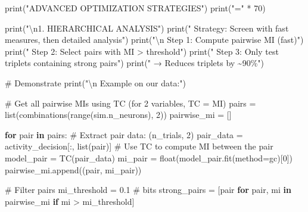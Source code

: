 \documentclass[
  11pt,
  letterpaper,
  oneside,
  openany]{book}
\newenvironment{Shaded}{\begin{snugshade}}{\end{snugshade}}
\newcommand{\BuiltInTok}[1]{\textcolor[rgb]{0.00,0.23,0.31}{#1}}
\newcommand{\CharTok}[1]{\textcolor[rgb]{0.13,0.47,0.30}{#1}}
\newcommand{\CommentTok}[1]{\textcolor[rgb]{0.37,0.37,0.37}{#1}}
\newcommand{\ControlFlowTok}[1]{\textcolor[rgb]{0.00,0.23,0.31}{\textbf{#1}}}
\newcommand{\DecValTok}[1]{\textcolor[rgb]{0.68,0.00,0.00}{#1}}
\newcommand{\FloatTok}[1]{\textcolor[rgb]{0.68,0.00,0.00}{#1}}
\newcommand{\KeywordTok}[1]{\textcolor[rgb]{0.00,0.23,0.31}{\textbf{#1}}}
\newcommand{\NormalTok}[1]{\textcolor[rgb]{0.00,0.23,0.31}{#1}}
\newcommand{\OperatorTok}[1]{\textcolor[rgb]{0.37,0.37,0.37}{#1}}
\newcommand{\StringTok}[1]{\textcolor[rgb]{0.13,0.47,0.30}{#1}}
\begin{document}
\begin{Shaded}
\begin{Highlighting}[]
\BuiltInTok{print}\NormalTok{(}\StringTok{"ADVANCED OPTIMIZATION STRATEGIES"}\NormalTok{)}
\BuiltInTok{print}\NormalTok{(}\StringTok{"="} \OperatorTok{*} \DecValTok{70}\NormalTok{)}

\BuiltInTok{print}\NormalTok{(}\StringTok{"}\CharTok{\textbackslash{}n}\StringTok{1. HIERARCHICAL ANALYSIS"}\NormalTok{)}
\BuiltInTok{print}\NormalTok{(}\StringTok{"   Strategy: Screen with fast measures, then detailed analysis"}\NormalTok{)}
\BuiltInTok{print}\NormalTok{(}\StringTok{"}\CharTok{\textbackslash{}n}\StringTok{   Step 1: Compute pairwise MI (fast)"}\NormalTok{)}
\BuiltInTok{print}\NormalTok{(}\StringTok{"   Step 2: Select pairs with MI \textgreater{} threshold"}\NormalTok{)}
\BuiltInTok{print}\NormalTok{(}\StringTok{"   Step 3: Only test triplets containing strong pairs"}\NormalTok{)}
\BuiltInTok{print}\NormalTok{(}\StringTok{"   → Reduces triplets by \textasciitilde{}90\%"}\NormalTok{)}

\CommentTok{\# Demonstrate}
\BuiltInTok{print}\NormalTok{(}\StringTok{"}\CharTok{\textbackslash{}n}\StringTok{   Example on our data:"}\NormalTok{)}

\CommentTok{\# Get all pairwise MIs using TC (for 2 variables, TC = MI)}
\NormalTok{pairs }\OperatorTok{=} \BuiltInTok{list}\NormalTok{(combinations(}\BuiltInTok{range}\NormalTok{(sim.n\_neurons), }\DecValTok{2}\NormalTok{))}
\NormalTok{pairwise\_mi }\OperatorTok{=}\NormalTok{ []}

\ControlFlowTok{for}\NormalTok{ pair }\KeywordTok{in}\NormalTok{ pairs:}
    \CommentTok{\# Extract pair data: (n\_trials, 2)}
\NormalTok{    pair\_data }\OperatorTok{=}\NormalTok{ activity\_decision[:, }\BuiltInTok{list}\NormalTok{(pair)]}
    \CommentTok{\# Use TC to compute MI between the pair}
\NormalTok{    model\_pair }\OperatorTok{=}\NormalTok{ TC(pair\_data)}
\NormalTok{    mi\_pair }\OperatorTok{=} \BuiltInTok{float}\NormalTok{(model\_pair.fit(method}\OperatorTok{=}\StringTok{\textquotesingle{}gc\textquotesingle{}}\NormalTok{)[}\DecValTok{0}\NormalTok{])}
\NormalTok{    pairwise\_mi.append((pair, mi\_pair))}

\CommentTok{\# Filter pairs}
\NormalTok{mi\_threshold }\OperatorTok{=} \FloatTok{0.1}  \CommentTok{\# bits}
\NormalTok{strong\_pairs }\OperatorTok{=}\NormalTok{ [pair }\ControlFlowTok{for}\NormalTok{ pair, mi }\KeywordTok{in}\NormalTok{ pairwise\_mi }\ControlFlowTok{if}\NormalTok{ mi }\OperatorTok{\textgreater{}}\NormalTok{ mi\_threshold]}


\end{Highlighting}
\end{Shaded}
\end{document}
